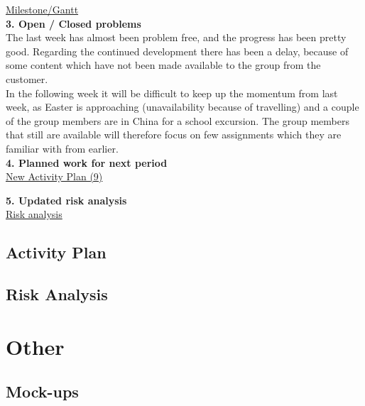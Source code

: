\documentclass[12pt,a4paper,titlepage]{article}
\begin{document}
\begin{appendices}
\href{https://docs.google.com/spreadsheet/ccc?key=0AlhGbQmvU9bddHl2VWVjWHhiX3VMREc0NWY4UE5hd3c&usp=sharing}{Milestone/Gantt}\\[6pt]

\textbf{3. Open / Closed problems}\\

The last week has almost been problem free, and the progress has been pretty good. Regarding the continued development there has been a delay, because of some content which have not been made available to the group from the customer.\\

In the following week it will be difficult to keep up the momentum from last week, as Easter is approaching (unavailability because of travelling) and a couple of the group members are in China for a school excursion. The group members that still are available will therefore focus on few assignments which they are familiar with from earlier.\\[6pt]

\textbf{4. Planned work for next period}\\

\href{https://docs.google.com/spreadsheet/ccc?key=0AqgF_sCiXohadDQ4SlZKTTZ1ZWZ6djF2dllaZGRPSGc&usp=drive_web#gid=0}{New Activity Plan (9)}

\textbf{5. Updated risk analysis}\\

\href{https://docs.google.com/spreadsheet/ccc?key=0AlhGbQmvU9bddGs0M0tBd3ZaNUxvMnBaQnNLb0FoWnc&usp=drive_web#gid=0}{Risk analysis}

\clearpage

\subsection{Activity Plan}

\subsection{Risk Analysis}





\section{Other}

\subsection{Mock-ups}
\label{sec:mockups}


\end{appendices}
\end{document}
